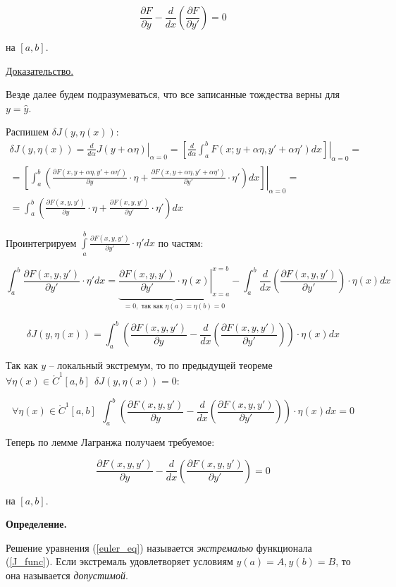 \begin{equation}\label{euler_eq}
\frac{\partial F}{\partial y} 
- \frac{d}{dx} \left( \frac{\partial F}{\partial y'} \right) = 0
\end{equation}

на $[a, b]$.

\pagebreak

\underline{Доказательство.}

Везде далее будем подразумеваться, что все записанные тождества верны для
$y = \widehat{y}$.

Распишем $\delta J(y, \eta(x))$:
\begin{multline*}
\delta J(y, \eta(x)) = 
\left. \frac{d}{d\alpha} J(y + \alpha \eta) \right|_{\alpha = 0} = 
\left. \left[ \frac{d}{d\alpha}
\int_a^b F(x; y + \alpha \eta,  y' + \alpha \eta') dx
\right] \right|_{\alpha = 0} = \\
= \left. \left[ \int_a^b 
\left( 
\frac{\partial F(x, y + \alpha \eta, y' + \alpha \eta')}
{\partial y} \cdot \eta +
\frac{\partial F(x, y + \alpha \eta, y' + \alpha \eta')}
{\partial y'} \cdot \eta' \right) dx
\right] \right|_{\alpha = 0} = \\
= \int_a^b \left(
\frac{\partial F(x, y, y')}
{\partial y} \cdot \eta + 
\frac{\partial F(x, y, y')}{\partial y'} \cdot \eta'
\right) dx
\end{multline*}

Проинтегрируем 
$\int \limits_a^b \frac{\partial F(x, y, y')}
{\partial y'} \cdot \eta' dx$ 
по частям:

\begin{equation*}
\int_a^b \frac{\partial F(x, y, y')}
{\partial y'} \cdot \eta' dx = 
\underbrace{\left. 
\frac{\partial F(x, y, y')}{\partial y'}
\cdot \eta(x) \right|_{x = a}^{x = b}}
_{= 0, \text{ так как } \eta(a) = \eta(b) = 0} 
- \int_a^b \frac{d}{dx} \left(
\frac{\partial F(x, y, y')}{\partial y'}
\right) \cdot \eta(x) dx
\end{equation*}

\begin{equation*}
\delta J(y, \eta(x)) = 
\int_a^b \left(
\frac{\partial F(x, y, y')}{\partial y} -
\frac{d}{dx} \left(
\frac{\partial F(x, y, y')}{\partial y'}
\right)
\right) \cdot \eta(x) dx
\end{equation*}

Так как $y$ -- локальный экстремум, то по предыдущей теореме
$\forall \eta(x) \in \mathring{C}^1 [a, b] \ \ 
\delta J(y, \eta(x)) = 0$:

$$
\forall \eta(x) \in \mathring{C}^1 [a, b] \ \ 
\int_a^b \left(
\frac{\partial F(x, y, y')}
{\partial y} -
\frac{d}{dx} \left(
\frac{\partial F(x, y, y')}{\partial y'}
\right)
\right) \cdot \eta(x) dx = 0
$$

Теперь по лемме Лагранжа получаем требуемое:

$$
\frac{\partial F(x, y, y')}
{\partial y} -
\frac{d}{dx} \left(
\frac{\partial F(x, y, y')}{\partial y'}
\right) = 0
$$

на $[a, b]$.

\textbf{Определение.}

Решение уравнения (\ref{euler_eq}) называется \textit{экстремалью}
функционала (\ref{J_func}).
Если экстремаль удовлетворяет условиям $y(a) = A, y(b) = B$, то
она называется \textit{допустимой}.